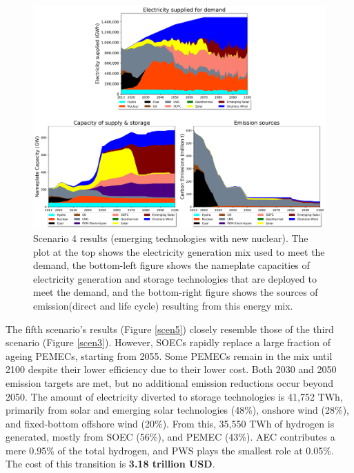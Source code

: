 \begin{figure}[H] 
\centering
\includegraphics[scale=0.5]{figures/newtechs_nuc}
\caption{Scenario 4 results (emerging technologies with new nuclear). The plot at the top shows the electricity generation mix used to meet the demand, the bottom-left figure shows the nameplate capacities of electricity generation and storage technologies that are deployed to meet the demand, and the bottom-right figure shows the sources of emission(direct and life cycle) resulting from this energy mix.}
\label{scen4}
\end{figure}

The fifth scenario's results (Figure \ref{scen5}) closely resemble those of the third scenario (Figure \ref{scen3}). However, \gls{SOEC}s rapidly replace a large fraction of ageing \gls{PEMEC}s, starting from 2055. Some \gls{PEMEC}s remain in the mix until 2100 despite their lower efficiency due to their lower cost. Both 2030 and 2050 emission targets are met, but no additional emission reductions occur beyond 2050. The amount of electricity diverted to storage technologies is 41,752 TWh, primarily from solar and emerging solar technologies (48\%), onshore wind (28\%), and fixed-bottom offshore wind (20\%). From this, 35,550 TWh of hydrogen is generated, mostly from \gls{SOEC} (56\%), and \gls{PEMEC} (43\%). \gls{AEC} contributes a mere 0.95\% of the total hydrogen, and \gls{PWS} plays the smallest role at 0.05\%. The cost of this transition is \textbf{3.18 trillion USD}.

